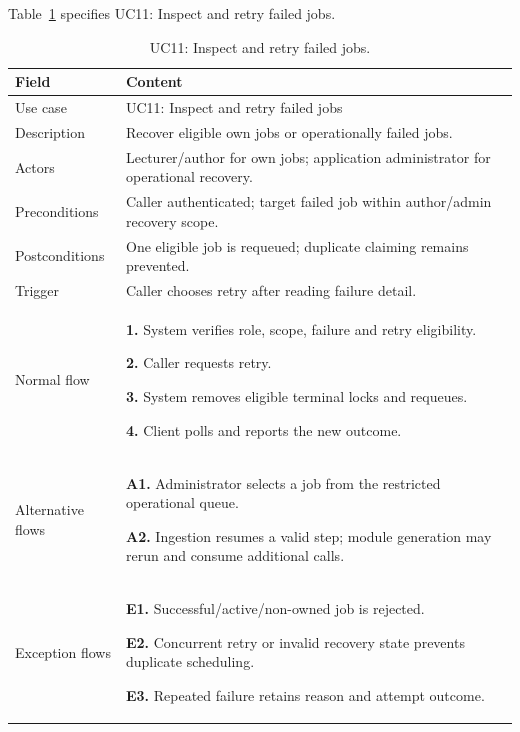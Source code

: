 \needspace{.39\textheight}
Table~\ref{tab:uc-11} specifies UC11: Inspect and retry failed jobs.
\begin{table}[H]\centering\footnotesize{}\renewcommand{\arraystretch}{1.05}
\caption{UC11: Inspect and retry failed jobs.}\label{tab:uc-11}
\begin{tabular}{|p{2.8cm}|p{11.9cm}|}\hline
\textbf{Field} & \textbf{Content}\\\hline
Use case & UC11: Inspect and retry failed jobs\\\hline
Description & Recover eligible own jobs or operationally failed jobs.\\\hline
Actors & Lecturer/author for own jobs; application administrator for operational recovery.\\\hline
Preconditions & Caller authenticated; target failed job within author/admin recovery scope.\\\hline
Postconditions & One eligible job is requeued; duplicate claiming remains prevented.\\\hline
Trigger & Caller chooses retry after reading failure detail.\\\hline
Normal flow & \textbf{1.} System verifies role, scope, failure and retry eligibility.\par \textbf{2.} Caller requests retry.\par \textbf{3.} System removes eligible terminal locks and requeues.\par \textbf{4.} Client polls and reports the new outcome.\\\hline
Alternative flows & \textbf{A1.} Administrator selects a job from the restricted operational queue.\par \textbf{A2.} Ingestion resumes a valid step; module generation may rerun and consume additional calls.\\\hline
Exception flows & \textbf{E1.} Successful/active/non-owned job is rejected.\par \textbf{E2.} Concurrent retry or invalid recovery state prevents duplicate scheduling.\par \textbf{E3.} Repeated failure retains reason and attempt outcome.\\\hline
\end{tabular}\end{table}

